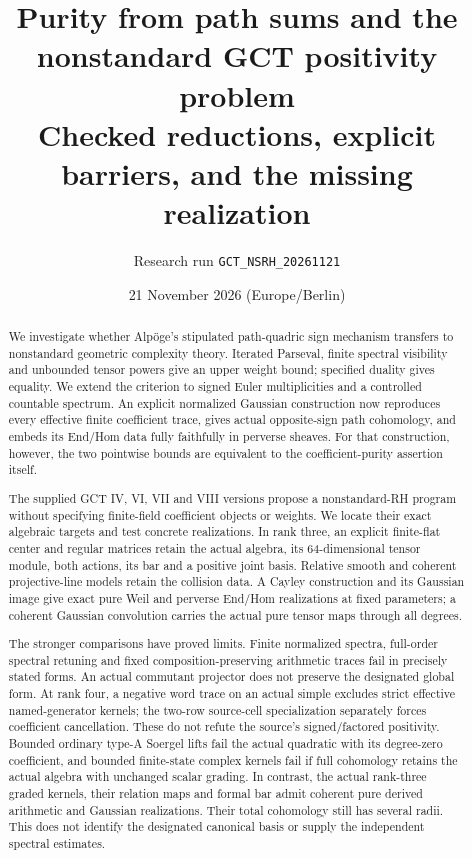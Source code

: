\documentclass[11pt,a4paper]{article}
\title{Purity from path sums and the nonstandard GCT positivity problem\\[4pt]\large Checked reductions, explicit barriers, and the missing realization}
\author{Research run \texttt{GCT\_NSRH\_20261121}}
\date{21 November 2026 (Europe/Berlin)}
\theoremstyle{named}\newtheorem{finding}{Finding}[section]
\theoremstyle{definition}\newtheorem{definition}[finding]{Definition}
\theoremstyle{remark}\newtheorem{remark}[finding]{Remark}
\begin{document}
\maketitle
\begin{abstract}
We investigate whether Alp\"oge's stipulated path-quadric sign mechanism transfers to nonstandard geometric complexity theory. Iterated Parseval, finite spectral visibility and unbounded tensor powers give an upper weight bound; specified duality gives equality. We extend the criterion to signed Euler multiplicities and a controlled countable spectrum. An explicit normalized Gaussian construction now reproduces every effective finite coefficient trace, gives actual opposite-sign path cohomology, and embeds its End/Hom data fully faithfully in perverse sheaves. For that construction, however, the two pointwise bounds are equivalent to the coefficient-purity assertion itself.

The supplied GCT IV, VI, VII and VIII versions propose a nonstandard-RH program without specifying finite-field coefficient objects or weights. We locate their exact algebraic targets and test concrete realizations. In rank three, an explicit finite-flat center and regular matrices retain the actual algebra, its 64-dimensional tensor module, both actions, its bar and a positive joint basis. Relative smooth and coherent projective-line models retain the collision data. A Cayley construction and its Gaussian image give exact pure Weil and perverse End/Hom realizations at fixed parameters; a coherent Gaussian convolution carries the actual pure tensor maps through all degrees.

The stronger comparisons have proved limits. Finite normalized spectra, full-order spectral retuning and fixed composition-preserving arithmetic traces fail in precisely stated forms. An actual commutant projector does not preserve the designated global form. At rank four, a negative word trace on an actual simple excludes strict effective named-generator kernels; the two-row source-cell specialization separately forces coefficient cancellation. These do not refute the source's signed/factored positivity. Bounded ordinary type-A Soergel lifts fail the actual quadratic with its degree-zero coefficient, and bounded finite-state complex kernels fail if full cohomology retains the actual algebra with unchanged scalar grading. In contrast, the actual rank-three graded kernels, their relation maps and formal bar admit coherent pure derived arithmetic and Gaussian realizations. Their total cohomology still has several radii. This does not identify the designated canonical basis or supply the independent spectral estimates.


\end{abstract}
\end{document}
